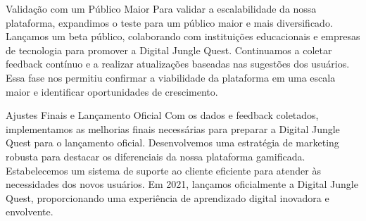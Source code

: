 Validação com um Público Maior
Para validar a escalabilidade da nossa plataforma, expandimos o teste para um público maior e mais diversificado. Lançamos um beta público, colaborando com instituições educacionais e empresas de tecnologia para promover a Digital Jungle Quest. Continuamos a coletar feedback contínuo e a realizar atualizações baseadas nas sugestões dos usuários. Essa fase nos permitiu confirmar a viabilidade da plataforma em uma escala maior e identificar oportunidades de crescimento.

Ajustes Finais e Lançamento Oficial
Com os dados e feedback coletados, implementamos as melhorias finais necessárias para preparar a Digital Jungle Quest para o lançamento oficial. Desenvolvemos uma estratégia de marketing robusta para destacar os diferenciais da nossa plataforma gamificada. Estabelecemos um sistema de suporte ao cliente eficiente para atender às necessidades dos novos usuários. Em 2021, lançamos oficialmente a Digital Jungle Quest, proporcionando uma experiência de aprendizado digital inovadora e envolvente.